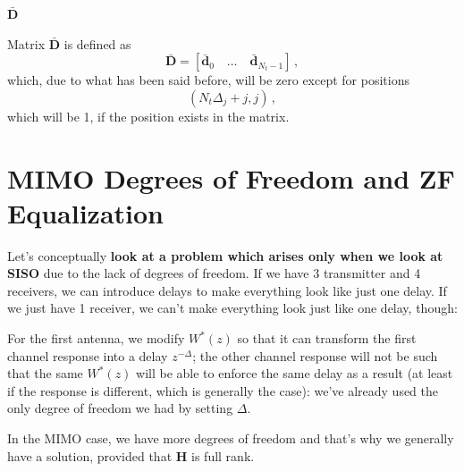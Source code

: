 \documentclass[a4paper, 12pt]{book}
\begin{document}
\vspace{1em}
\noindent
\colorbox{obsidianBlue}{%
    \begin{minipage}{\dimexpr\linewidth-2\fboxsep}
    \textcolor{obsidianTextBlue}{\textbf{\faAtom $\bar{\mathbf{D}}$}}
    
    Matrix $\bar{\mathbf{D}}$ is defined as
    \[ \bar{\mathbf{D}} = [\bar{\mathbf{d}}_0 \quad \dots \quad \bar{\mathbf{d}}_{N_t-1}] \,, \]
    which, due to what has been said before, will be zero except for positions
    \[ (N_t\Delta_j + j, j) \,, \]
    which will be 1, if the position exists in the matrix.
    \end{minipage}%
}
\section{MIMO Degrees of Freedom and ZF Equalization}

Let's conceptually \textbf{look at a problem which arises only when we look at SISO} due to the lack of degrees of freedom.
If we have 3 transmitter and 4 receivers, we can introduce delays to make everything look like just one delay.
If we just have 1 receiver, we can't make everything look just like one delay, though:

\begin{center}
\end{center}

For the first antenna, we modify $W^*(z)$ so that it can transform the first channel response into a delay $z^{-\Delta}$; the other channel response will not be such that the same $W^*(z)$ will be able to enforce the same delay as a result (at least if the response is different, which is generally the case): we've already used the only degree of freedom we had by setting $\Delta$.

\begin{remark}
In the MIMO case, we have more degrees of freedom and that's why we generally have a solution, provided that $\mathbf{H}$ is full rank.
\end{remark}
\end{document}
